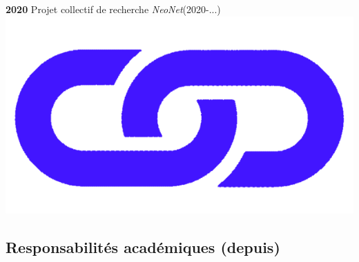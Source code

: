 \documentclass{article}
\begin{document}
\textbf{2020} Projet collectif de recherche \textit{NeoNet}(2020-...) \href{https://redneonet.com/}{\includegraphics[scale=0.02]{link_darkblue.png}}\\
\smallbreak

\subsection*{Responsabilités académiques (depuis)}
\end{document}
